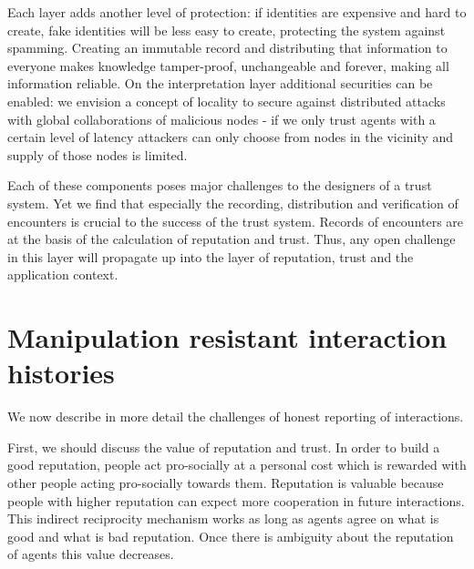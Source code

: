 \vspace{0.5cm}
Each layer adds another level of protection: if identities are expensive and hard to create, fake 
identities will be less easy to create, protecting the system against spamming. Creating an immutable
record and distributing that information to everyone makes knowledge tamper-proof, unchangeable and 
forever, making all information reliable. On the interpretation layer additional securities can be 
enabled: we envision a concept of locality to secure against distributed attacks with global 
collaborations of malicious nodes - if we only trust agents with a certain level of latency 
attackers can only choose from nodes in the vicinity and supply of those nodes is limited. 

Each of these components poses major challenges to the designers of a trust system. Yet we find 
that especially the recording, distribution and verification of encounters is crucial to the 
success of the trust system. Records of encounters are at the basis of the calculation of
reputation and trust. Thus, any open challenge in this layer will propagate up into the layer
of reputation, trust and the application context.

\section{Manipulation resistant interaction histories}
We now describe in more detail the challenges of honest reporting of interactions.

First, we should discuss the value of reputation and trust. In order to build a good reputation,
people act pro-socially at a personal cost which is rewarded with other people acting pro-socially 
towards them. Reputation is valuable because people with higher 
reputation can expect more cooperation in future interactions. This indirect reciprocity mechanism 
works as long as agents agree on what is good and what is bad reputation. Once there is ambiguity 
about the reputation of agents this value decreases. 

